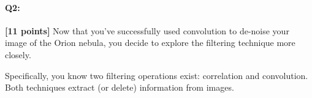 \documentclass[11pt]{article}
\begin{document}
\begin{enumerate}[(a)]

\end{enumerate}


\pagebreak
\paragraph{Q2:} \textbf{[11 points]} Now that you've successfully used convolution to de-noise your image of the Orion nebula, you decide to explore the filtering technique more closely. 

Specifically, you know two filtering operations exist: correlation and convolution. Both techniques extract (or delete) information from images.
\end{document}
